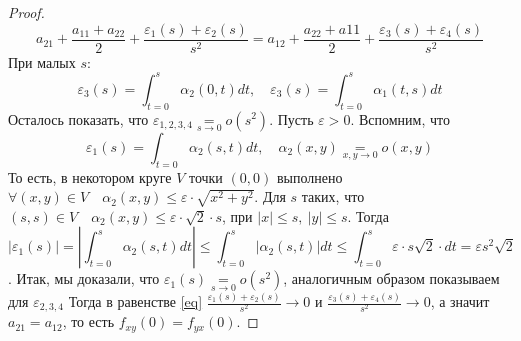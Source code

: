 \begin{theorem}
\begin{proof}
        \begin{equation}
            \label{eq}
            a_{21} + \frac{a_{11} + a_{22}}{2} + \frac{\varepsilon_1(s) + \varepsilon_2(s)}{s^2} = a_{12} + \frac{a_{22} + a{11}}{2} + \frac{\varepsilon_3(s) + \varepsilon_4(s)}{s^2}
        \end{equation}
        При малых $s$:
        \[\varepsilon_3(s) = \int_{t=0}^{s}\alpha_2(0, t)dt, \quad \varepsilon_3(s) = \int_{t=0}^{s}\alpha_1(t,s)dt\]
        Осталось показать, что $\varepsilon_{1,2,3,4} \underset{s \to 0}{=} o(s^2)$.
        Пусть $\varepsilon > 0$. Вспомним, что 
        \[\varepsilon_1(s) = \int_{t = 0}^{}\alpha_2(s,t)dt, \quad \alpha_2(x,y) \underset{x,y \to 0}{=} o(x,y)\]
        То есть, в некотором круге $V$ точки $(0,0)$ выполнено $\forall (x,y) \in V \quad \alpha_2(x,y) \leq \varepsilon \cdot \sqrt{x^2 + y^2}$.
        Для $s$ таких, что $(s,s) \in V \quad \alpha_2(x,y) \leq \varepsilon \cdot \sqrt{2} \cdot s$, при $\left| x \right| \leq s, \ \left| y \right| \leq s$.
        Тогда 
        \[\left| \varepsilon_1(s)\right| = \left| \int_{t=0}^{s}\alpha_2(s,t)dt \right| \leq \int_{t=0}^{s} \left|\alpha_2(s,t)\right|dt 
        \leq \int_{t=0}^{s}\varepsilon\cdot s\sqrt{2}\cdot dt = \varepsilon s^2\sqrt{2}\].
        Итак, мы доказали, что $\varepsilon_1(s) \underset{s \to 0}{=} o(s^2)$, аналогичным образом показываем для $\varepsilon_{2,3,4}$
        Тогда в равенстве \ref{eq} $\frac{\varepsilon_1(s) + \varepsilon_2(s)}{s^2} \to 0$ и $\frac{\varepsilon_3(s) + \varepsilon_4(s)}{s^2} \to 0$, а значит $a_{21} = a_{12}$,
        то есть $f_{xy}(0) = f_{yx}(0)$.
    \end{proof}
\end{theorem}